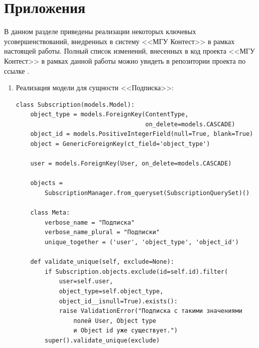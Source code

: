 \documentclass[12pt, a4paper, oneside]{article}
\begin{document}
\section{Приложения}
В данном разделе приведены реализации некоторых ключевых усовершенствований, внедренных в систему <<МГУ Контест>> в рамках настоящей работы. Полный список изменений, внесенных в код \cite{msu-contest} проекта <<МГУ Контест>> в рамках данной работы можно увидеть в репозитории проекта по ссылке \cite{msu-contest-commits}.

\begin{enumerate}[wide, labelindent=0pt]
    \item {
        Реализация модели для сущности <<Подписка>>:\label{code:subscription}
        \begin{verbatim}
class Subscription(models.Model):
    object_type = models.ForeignKey(ContentType, 
                                    on_delete=models.CASCADE)
    object_id = models.PositiveIntegerField(null=True, blank=True)
    object = GenericForeignKey(ct_field='object_type')

    user = models.ForeignKey(User, on_delete=models.CASCADE)

    objects = 
        SubscriptionManager.from_queryset(SubscriptionQuerySet)()

    class Meta:
        verbose_name = "Подписка"
        verbose_name_plural = "Подписки"
        unique_together = ('user', 'object_type', 'object_id')

    def validate_unique(self, exclude=None):
        if Subscription.objects.exclude(id=self.id).filter(
            user=self.user, 
            object_type=self.object_type, 
            object_id__isnull=True).exists():
            raise ValidationError("Подписка с такими значениями 
                полей User, Object type 
                и Object id уже существует.")
        super().validate_unique(exclude)


\end{verbatim}}
\end{enumerate}
\end{document}
